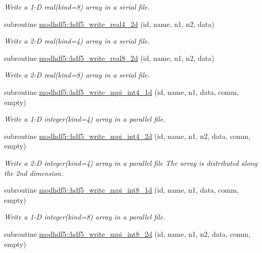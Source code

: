 \begin{DoxyCompactItemize}
\begin{DoxyCompactList}\small\item\em Write a 1-\/D real(kind=8) array in a serial file. \end{DoxyCompactList}\item 
subroutine \hyperlink{namespacemodhdf5_a71a612d3c6bc8959576fe46d7bab679f}{modhdf5\+::hdf5\+\_\+write\+\_\+real4\+\_\+2d} (id, name, n1, n2, data)
\begin{DoxyCompactList}\small\item\em Write a 2-\/D real(kind=4) array in a serial file. \end{DoxyCompactList}\item 
subroutine \hyperlink{namespacemodhdf5_a86d263896481bcb679282cede10ab4a1}{modhdf5\+::hdf5\+\_\+write\+\_\+real8\+\_\+2d} (id, name, n1, n2, data)
\begin{DoxyCompactList}\small\item\em Write a 2-\/D real(kind=8) array in a serial file. \end{DoxyCompactList}\item 
subroutine \hyperlink{namespacemodhdf5_af38c097f92a373ed47962ec1e02f4cb3}{modhdf5\+::hdf5\+\_\+write\+\_\+mpi\+\_\+int4\+\_\+1d} (id, name, n1, data, comm, empty)
\begin{DoxyCompactList}\small\item\em Write a 1-\/D integer(kind=4) array in a parallel file. \end{DoxyCompactList}\item 
subroutine \hyperlink{namespacemodhdf5_a727abaf04f522d9a2a2accdbf3512a96}{modhdf5\+::hdf5\+\_\+write\+\_\+mpi\+\_\+int4\+\_\+2d} (id, name, n1, n2, data, comm, empty)
\begin{DoxyCompactList}\small\item\em Write a 2-\/D integer(kind=4) array in a parallel file The array is distributed along the 2nd dimension. \end{DoxyCompactList}\item 
subroutine \hyperlink{namespacemodhdf5_a3402bae4c5e2b0e315c1728b264798da}{modhdf5\+::hdf5\+\_\+write\+\_\+mpi\+\_\+int8\+\_\+1d} (id, name, n1, data, comm, empty)
\begin{DoxyCompactList}\small\item\em Write a 1-\/D integer(kind=8) array in a parallel file. \end{DoxyCompactList}\item 
subroutine \hyperlink{namespacemodhdf5_a2ca2e47f5fe959ef8cbf3bdad5bef7f8}{modhdf5\+::hdf5\+\_\+write\+\_\+mpi\+\_\+int8\+\_\+2d} (id, name, n1, n2, data, comm, empty)

\end{DoxyCompactItemize}
